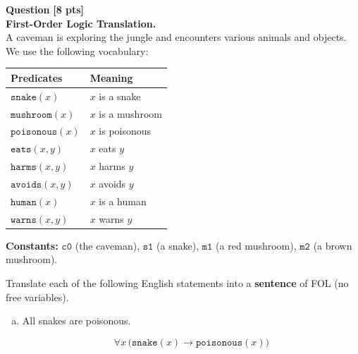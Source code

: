 
\setcounter{qnum}{0}
\newcommand{\question}[2]{%
  \stepcounter{qnum}%
  \noindent\textbf{Question \theqnum} \hfill \textbf{[#1 pts]}\\[1mm]
  \noindent #2
  \vspace{4mm}
}

\question{8}{%
\textbf{First-Order Logic Translation.}\\[2mm]
A caveman is exploring the jungle and encounters various animals and objects. We use the following vocabulary:

\vspace{2mm}
\begin{center}
\begin{tabular}{ll}
\hline
\textbf{Predicates} & \textbf{Meaning} \\
\hline
$\texttt{snake}(x)$ & $x$ is a snake \\
$\texttt{mushroom}(x)$ & $x$ is a mushroom \\
$\texttt{poisonous}(x)$ & $x$ is poisonous \\
$\texttt{eats}(x, y)$ & $x$ eats $y$ \\
$\texttt{harms}(x, y)$ & $x$ harms $y$ \\
$\texttt{avoids}(x, y)$ & $x$ avoids $y$ \\
$\texttt{human}(x)$ & $x$ is a human \\
$\texttt{warns}(x, y)$ & $x$ warns $y$ \\
\hline
\end{tabular}
\end{center}

\vspace{2mm}
\noindent \textbf{Constants:} $\texttt{c0}$ (the caveman), $\texttt{s1}$ (a snake), $\texttt{m1}$ (a red mushroom), $\texttt{m2}$ (a brown mushroom).

\vspace{4mm}
\noindent
Translate each of the following English statements into a \textbf{sentence} of FOL (no free variables).

\begin{enumerate}[(a)]
  \item \points[2] All snakes are poisonous.
  \begin{sol}
    \[\forall x\,\bigl(\texttt{snake}(x) \rightarrow \texttt{poisonous}(x)\bigr)\]
  \end{sol}


\end{enumerate}}
